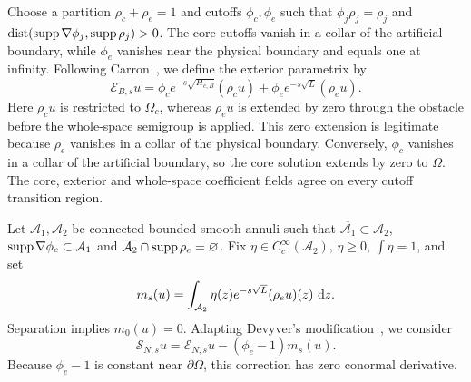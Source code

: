 \documentclass[12pt]{amsart}
\newcommand\dd{\,{\rm d}}
\newcommand{\supp}{{\rm supp}{\hspace{.05cm}}}
\newcommand{\dist}{\operatorname{dist}}
\newcommand{\cA}{\mathcal A}
\theoremstyle{remark}
\begin{document}
Choose a partition $\rho_c+\rho_e=1$ and cutoffs $\phi_c,\phi_e$ such that
$\phi_j\rho_j=\rho_j$ and
$\dist(\supp\nabla\phi_j,\supp\rho_j)>0$.  The core cutoffs vanish in a
collar of the artificial boundary, while $\phi_e$ vanishes near the physical
boundary and equals one at infinity.  Following Carron~\cite{Carron07},
we define the exterior parametrix by
\begin{equation}\label{eq:exterior-Carron}
 \mathcal E_{B,s}u=
 \phi_ce^{-s\sqrt{H_{c,B}}}(\rho_cu)
 +\phi_ee^{-s\sqrt L}(\rho_eu).
\end{equation}
Here \(\rho_cu\) is restricted to \(\Omega_c\), whereas \(\rho_eu\) is
extended by zero through the obstacle before the whole-space semigroup is
applied.  This zero extension is legitimate because \(\rho_e\) vanishes in
a collar of the physical boundary.  Conversely, \(\phi_c\) vanishes in a
collar of the artificial boundary, so the core solution extends by zero to
\(\Omega\).  The core, exterior and whole-space coefficient fields agree
on every cutoff transition region.

Let $\cA_1,\cA_2$ be connected bounded smooth annuli such that
$\overline{\cA_1}\subset\cA_2$,
$\supp\nabla\phi_e\subset\cA_1$ and
$\overline{\cA_2}\cap\supp\rho_e=\varnothing$.  Fix
$\eta\in C_c^\infty(\cA_2)$, $\eta\geq0$, $\int\eta=1$, and set
\[
 m_s(u)=\int_{\cA_2}\eta(z)e^{-s\sqrt L}(\rho_eu)(z)\,\dd z.
\]
Separation implies $m_0(u)=0$.  Adapting Devyver's
modification~\cite{Devyver15}, we consider
\begin{equation}\label{eq:exterior-Devyver}
 \mathcal S_{N,s}u=
 \mathcal E_{N,s}u-(\phi_e-1)m_s(u).
\end{equation}
Because $\phi_e-1$ is constant near $\partial\Omega$, this correction has
zero conormal derivative.
\end{document}
